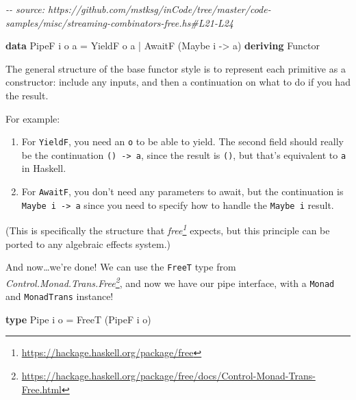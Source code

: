 \documentclass[]{article}
\newenvironment{Shaded}{}{}
\newcommand{\CommentTok}[1]{\textcolor[rgb]{0.38,0.63,0.69}{\textit{#1}}}
\newcommand{\DataTypeTok}[1]{\textcolor[rgb]{0.56,0.13,0.00}{#1}}
\newcommand{\KeywordTok}[1]{\textcolor[rgb]{0.00,0.44,0.13}{\textbf{#1}}}
\newcommand{\NormalTok}[1]{#1}
\newcommand{\OperatorTok}[1]{\textcolor[rgb]{0.40,0.40,0.40}{#1}}
\newcommand{\OtherTok}[1]{\textcolor[rgb]{0.00,0.44,0.13}{#1}}
\renewcommand{\href}[2]{#2\footnote{\url{#1}}}
\begin{document}
\begin{Shaded}
\begin{Highlighting}[]
\CommentTok{{-}{-} source: https://github.com/mstksg/inCode/tree/master/code{-}samples/misc/streaming{-}combinators{-}free.hs\#L21{-}L24}

\KeywordTok{data} \DataTypeTok{PipeF}\NormalTok{ i o a }\OtherTok{=}
    \DataTypeTok{YieldF}\NormalTok{ o a}
  \OperatorTok{|} \DataTypeTok{AwaitF}\NormalTok{ (}\DataTypeTok{Maybe}\NormalTok{ i }\OtherTok{{-}>}\NormalTok{ a)}
    \KeywordTok{deriving} \DataTypeTok{Functor}
\end{Highlighting}
\end{Shaded}

The general structure of the base functor style is to represent each primitive
as a constructor: include any inputs, and then a continuation on what to do if
you had the result.

For example:

\begin{enumerate}
\def\labelenumi{\arabic{enumi}.}
\tightlist
\item
  For \texttt{YieldF}, you need an \texttt{o} to be able to yield. The second
  field should really be the continuation \texttt{()\ -\textgreater{}\ a}, since
  the result is \texttt{()}, but that's equivalent to \texttt{a} in Haskell.
\item
  For \texttt{AwaitF}, you don't need any parameters to await, but the
  continuation is \texttt{Maybe\ i\ -\textgreater{}\ a} since you need to
  specify how to handle the \texttt{Maybe\ i} result.
\end{enumerate}

(This is specifically the structure that
\emph{\href{https://hackage.haskell.org/package/free}{free}} expects, but this
principle can be ported to any algebraic effects system.)

And now\ldots we're done! We can use the \texttt{FreeT} type from
\emph{\href{https://hackage.haskell.org/package/free/docs/Control-Monad-Trans-Free.html}{Control.Monad.Trans.Free}},
and now we have our pipe interface, with a \texttt{Monad} and
\texttt{MonadTrans} instance!

\begin{Shaded}
\begin{Highlighting}[]
\KeywordTok{type} \DataTypeTok{Pipe}\NormalTok{ i o }\OtherTok{=} \DataTypeTok{FreeT}\NormalTok{ (}\DataTypeTok{PipeF}\NormalTok{ i o)}
\end{Highlighting}
\end{Shaded}
\end{document}
